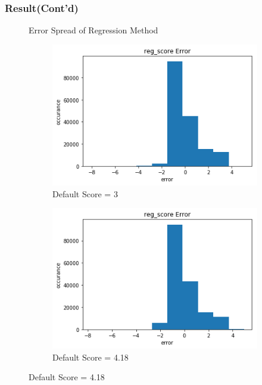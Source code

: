 \documentclass[11pt]{beamer}
\begin{document}
\begin{frame}
\frametitle{Result(Cont'd)}

\begin{figure}[h!]
  \centering
  Error Spread of Regression Method\\
  \begin{subfigure}[b]{0.45\textwidth}
    \caption{Default Score = 3}
    \includegraphics[width=\linewidth]{reg_error_3}
  \end{subfigure}
  \begin{subfigure}[b]{0.45\textwidth}
    \caption{Default Score = 4.18}
    \includegraphics[width=\linewidth]{reg_error_train_mean}
  \end{subfigure}
\end{figure}

\end{frame}
\end{document}
